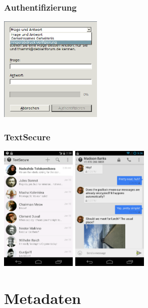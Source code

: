 \documentclass[12pt]{beamer}
\begin{document}
\begin{frame}
  \frametitle{Authentifizierung}
    \begin{center}
      \includegraphics[height=5cm]{img/auth.png}
    \end{center}
\end{frame}

\begin{frame}
  \frametitle{TextSecure}
    \begin{center}
      \includegraphics[height=6cm]{img/textsecure1.png}
      \hspace{0.5cm}
      \includegraphics[height=6cm]{img/textsecure2.png}
    \end{center}
\end{frame}
 
\section{Metadaten}
\end{document}
